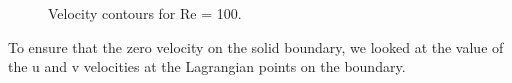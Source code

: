 \begin{figure}[H]
    \centering
    \quad
    \caption{Velocity contours for Re = 100.}
    \label{fig:contourPlotsForFlowOverCylidnerGE}
\end{figure}

To ensure that the zero velocity on the solid boundary, we looked at the value of the u and v velocities at the Lagrangian points on the boundary.